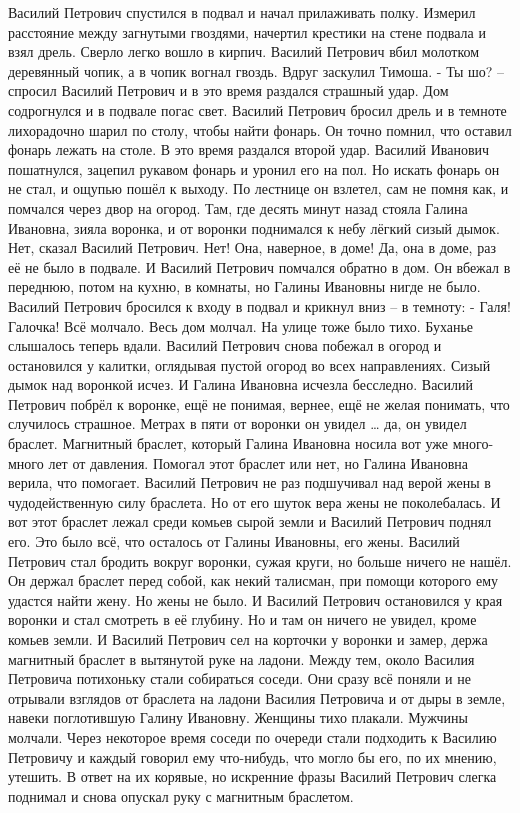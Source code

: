 Василий Петрович спустился в подвал и начал прилаживать полку. Измерил расстояние между загнутыми гвоздями, начертил крестики на стене подвала и взял дрель. Сверло легко вошло в кирпич. Василий Петрович вбил молотком деревянный чопик, а в чопик вогнал гвоздь. Вдруг заскулил Тимоша.
- Ты шо? – спросил Василий Петрович и в это время раздался страшный удар. Дом содрогнулся и в подвале погас свет. Василий Петрович бросил дрель и в темноте лихорадочно шарил по столу, чтобы найти фонарь. Он точно помнил, что оставил фонарь лежать на столе. В это время раздался второй удар. Василий Иванович пошатнулся, зацепил рукавом фонарь и уронил его на пол. Но искать фонарь он не стал, и ощупью пошёл к выходу. По лестнице он взлетел, сам не помня как, и помчался через двор на огород. Там, где десять минут назад стояла Галина Ивановна, зияла воронка, и от воронки поднимался к небу лёгкий сизый дымок.
Нет, сказал Василий Петрович. Нет! Она, наверное, в доме! Да, она в доме, раз её не было в подвале. И Василий Петрович помчался обратно в дом. Он вбежал в переднюю, потом на кухню, в комнаты, но Галины Ивановны нигде не было. Василий Петрович бросился к входу в подвал и крикнул вниз – в темноту: - Галя! Галочка!
Всё молчало. Весь дом молчал. На улице тоже было тихо. Буханье слышалось теперь вдали. Василий Петрович снова побежал в огород и остановился у калитки, оглядывая пустой огород во всех направлениях. Сизый дымок над воронкой исчез. И Галина Ивановна исчезла бесследно. Василий Петрович побрёл к воронке, ещё не понимая, вернее, ещё не желая понимать, что случилось страшное. Метрах в пяти от воронки он увидел … да, он увидел браслет. Магнитный браслет, который Галина Ивановна носила вот уже много-много лет от давления. Помогал этот браслет или нет, но Галина Ивановна верила, что помогает. Василий Петрович не раз подшучивал над верой жены в чудодейственную силу браслета. Но от его шуток вера жены не поколебалась. И вот этот браслет лежал среди комьев сырой земли и Василий Петрович поднял его. Это было всё, что осталось от Галины Ивановны, его жены. Василий Петрович стал бродить вокруг воронки, сужая круги, но больше ничего не нашёл. Он держал браслет перед собой, как некий талисман, при помощи которого ему удастся найти жену. Но жены не было. И Василий Петрович остановился у края воронки и стал смотреть в её глубину. Но и там он ничего не увидел, кроме комьев земли. И Василий Петрович сел на корточки у воронки и замер, держа магнитный браслет в вытянутой руке на ладони.
Между тем, около Василия Петровича потихоньку стали собираться соседи. Они сразу всё поняли и не отрывали взглядов от браслета на ладони Василия Петровича и от дыры в земле, навеки поглотившую Галину Ивановну. Женщины тихо плакали. Мужчины молчали. Через некоторое время соседи по очереди стали подходить к Василию Петровичу и каждый говорил ему что-нибудь, что могло бы его, по их мнению, утешить. В ответ на их корявые, но искренние фразы Василий Петрович слегка поднимал и снова опускал руку с магнитным браслетом.
